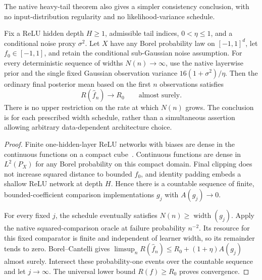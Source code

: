 The native heavy-tail theorem also gives a simpler consistency conclusion, with no input-distribution regularity and no likelihood-variance schedule.
\begin{corollary}
\label{cor:universal-consistency}
Fix a ReLU hidden depth $H\ge1$, admissible tail indices, $0<\eta\le1$, and a conditional noise proxy $\sigma^2$. Let $X$ have any Borel probability law on $[-1,1]^d$, let $f_0\in[-1,1]$, and retain the conditional sub-Gaussian noise assumption. For every deterministic sequence of widths $N(n)\to\infty$, use the native layerwise prior and the single fixed Gaussian observation variance $16(1+\sigma^2)/\eta$. Then the ordinary final posterior mean based on the first $n$ observations satisfies
\[
 R(\widehat f_n)\longrightarrow R_0
 \qquad\text{almost surely}.
\]
There is no upper restriction on the rate at which $N(n)$ grows. The conclusion is for each prescribed width schedule, rather than a simultaneous assertion allowing arbitrary data-dependent architecture choice.
\end{corollary}
\begin{proof}
Finite one-hidden-layer ReLU networks with biases are dense in the continuous functions on a compact cube~\cite{universal}. Continuous functions are dense in $L^2(P_X)$ for any Borel probability on this compact domain. Final clipping does not increase squared distance to bounded $f_0$, and identity padding embeds a shallow ReLU network at depth $H$. Hence there is a countable sequence of finite, bounded-coefficient comparison implementations $g_j$ with $A(g_j)\to0$.

For every fixed $j$, the schedule eventually satisfies $N(n)\ge\operatorname{width}(g_j)$. Apply the native squared-comparison oracle at failure probability $n^{-2}$. Its resource for this fixed comparator is finite and independent of learner width, so its remainder tends to zero. Borel--Cantelli gives
$\limsup_n R(\widehat f_n)\le R_0+(1+\eta)A(g_j)$ almost surely. Intersect these probability-one events over the countable sequence and let $j\to\infty$. The universal lower bound $R(f)\ge R_0$ proves convergence.
\end{proof}
